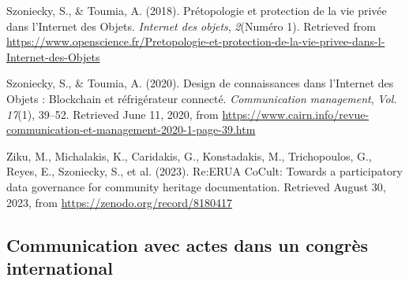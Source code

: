 \documentclass[
  a4paper,
  DIV=11,
  numbers=noendperiod]{scrreprt}
\newlength{\cslhangindent}
\newenvironment{CSLReferences}[2] %
 {\begin{list}{}{%
  \setlength{\itemindent}{0pt}
  \setlength{\leftmargin}{0pt}
  \setlength{\parsep}{0pt}
  \ifodd #1
   \setlength{\leftmargin}{\cslhangindent}
   \setlength{\itemindent}{-1\cslhangindent}
  \fi
  \setlength{\itemsep}{#2\baselineskip}}}
 {\end{list}}
\begin{document}
\begin{CSLReferences}{1}{0}
Szoniecky, S., \& Toumia, A. (2018). Prétopologie et protection de la
vie privée dans l'{Internet} des {Objets}. \emph{Internet des objets},
\emph{2}(Numéro 1). Retrieved from
\url{https://www.openscience.fr/Pretopologie-et-protection-de-la-vie-privee-dans-l-Internet-des-Objets}

Szoniecky, S., \& Toumia, A. (2020). Design de connaissances dans
l'{Internet} des {Objets} : {Blockchain} et réfrigérateur connecté.
\emph{Communication management}, \emph{Vol. 17}(1), 39--52. Retrieved
June 11, 2020, from
\url{https://www.cairn.info/revue-communication-et-management-2020-1-page-39.htm}

Ziku, M., Michalakis, K., Caridakis, G., Konstadakis, M., Trichopoulos,
G., Reyes, E., Szoniecky, S., et al. (2023). Re:{ERUA} {CoCult}:
{Towards} a participatory data governance for community heritage
documentation. Retrieved August 30, 2023, from
\url{https://zenodo.org/record/8180417}

\end{CSLReferences}

\subsection{Communication avec actes dans un congrès
international}\label{sec-item299379}
\end{document}
